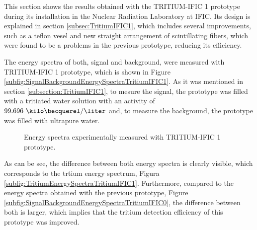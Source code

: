 This section shows the results obtained with the TRITIUM-IFIC 1 prototype  during its installation in the Nuclear Radiation Laboratory at IFIC. Its design is explained in section \ref{subsec:TritiumIFIC1}, which includes several improvements, such as a teflon vesel and new straight arrangement of scintillating fibers, which were found to be a problems in the previous prototype, reducing its efficiency.

The energy spectra of both, signal and background, were measured with TRITIUM-IFIC 1 prototype, which is shown in Figure \ref{subfig:SignalBackgroundEnergySpectraTritiumIFIC1}. As it was mentioned in section \ref{subsection:TritiumIFIC1}, to mesure the signal, the prototype was filled with a tritiated water solution with an activity of $99.696~\kilo\becquerel/\liter$ and, to measure the background, the prototype was filled with ultrapure water.

\begin{figure}[h]
 \centering
   \newline
 \caption{Energy spectra experimentally measured with TRITIUM-IFIC 1 prototype.}
 \label{fig:EnergySpectraTRITIUMIFIC1}
\end{figure}


As can be see, the difference between both energy spectra is clearly visible, which corresponds to the trtium energy spectrum, Figura \ref{subfig:TritiumEnergySpectraTritiumIFIC1}. Furthermore, compared to the energy spectra obtained with the previous prototype, Figure \ref{subfig:SignalBackgroundEnergySpectraTritiumIFIC0}, the difference between both is larger, which implies that the tritium detection efficiency of this prototype was improved.

